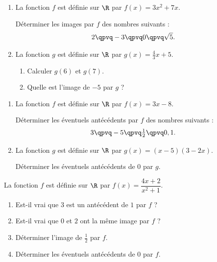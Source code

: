 
\exo

\begin{enumerate}
\item La fonction $f$ est définie sur $\R$ par $f(x)=3x^2+7x$.

Déterminer les images par $f$ des nombres suivants :
\[2\qpvq -3\qpvq 0\qpvq \sqrt{5}.\]
\item La fonction $g$ est définie sur $\R$ par $g(x)=\frac{4}{3}x+5$.

\begin{enumerate}
\item Calculer $g(6)$ et $g(7)$.
\item Quelle est l'image de $-5$ par $g$ ?
\end{enumerate}
\end{enumerate}

\exo

\begin{enumerate}
\item La fonction $f$ est définie sur $\R$ par $f(x)=3x-8$.

Déterminer les éventuels antécédents par $f$ des nombres suivants :
\[3\qpvq -5\qpvq \tfrac{1}{2}\qpvq 0,1.\]
\item La fonction $g$ est définie sur $\R$ par $g(x)=(x-5)(3-2x)$.

Déterminer les éventuels antécédents de $0$ par $g$.
\end{enumerate}

\exo

La fonction $f$ est définie sur $\R$ par $f(x)=\dfrac{4x+2}{x^2+1}$.
\begin{enumerate}
\item Est-il vrai que $3$ est un antécédent de $1$ par $f$ ?
\item Est-il vrai que $0$ et $2$ ont la même image par $f$ ?
\item Déterminer l'image de $\frac{1}{2}$ par $f$.
\item Déterminer les éventuels antécédents de $0$ par $f$.
\end{enumerate}

\exo


